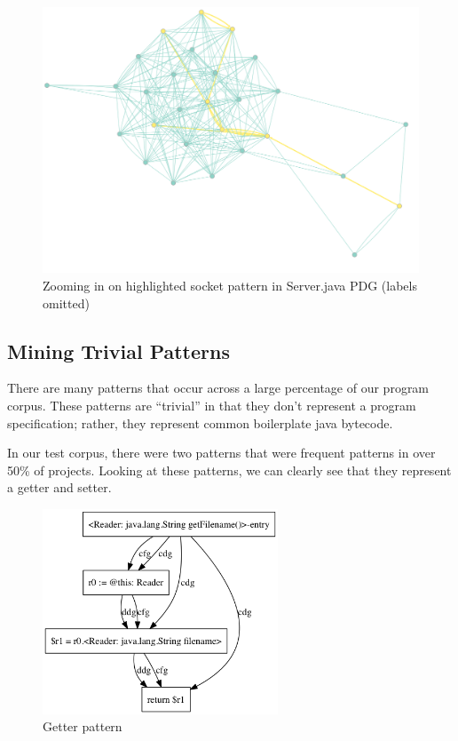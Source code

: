 \documentclass[12pt]{article}
\begin{document}
\begin{figure}[ht]
\centerline{
\includegraphics[width=\linewidth]{patterns/networking_isomorphism_zoomed.png}
}
\caption{\label{networking_isomorphism_zoomed}
    Zooming in on highlighted socket pattern in Server.java PDG (labels omitted)
}
\end{figure}


\subsection{Mining Trivial Patterns}
There are many patterns that occur across a large percentage of our program corpus. These patterns are ``trivial'' in that they don't represent a program specification; rather, they represent common boilerplate java bytecode.

In our test corpus, there were two patterns that were frequent patterns in over 50\% of projects. Looking at these patterns, we can clearly see that they represent a getter and setter.

\begin{figure}[ht]
\centerline{
\includegraphics[width=7cm]{patterns/reader_getter.png}
}
\caption{\label{reader_getter}
    Getter pattern
}
\end{figure}
\end{document}
